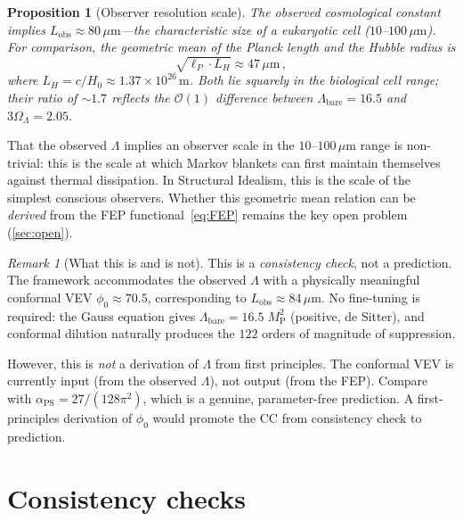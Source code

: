 \documentclass[12pt, a4paper]{article}
\newtheorem{proposition}[theorem]{Proposition}
\theoremstyle{definition}
\theoremstyle{remark}
\newtheorem{remark}[theorem]{Remark}
\newcommand{\MP}{M_{\mathrm{P}}}
\newcommand{\aPS}{\alpha_{\mathrm{PS}}}
\newcommand{\Lobs}{L_{\mathrm{obs}}}
\begin{document}
\begin{proposition}[Observer resolution scale]
\label{prop:Lobs}
The observed cosmological constant implies $\Lobs \approx 80\,\mu\mathrm{m}$---the characteristic size of a eukaryotic cell ($10$--$100\,\mu\mathrm{m}$).
For comparison, the geometric mean of the Planck length and the Hubble radius is
\begin{equation}
\sqrt{\ell_P \cdot L_H} \approx 47\,\mu\mathrm{m}\,,
\end{equation}
where $L_H = c/H_0 \approx 1.37 \times 10^{26}\,\mathrm{m}$.
Both lie squarely in the biological cell range; their ratio of $\sim 1.7$ reflects the $\mathcal{O}(1)$ difference between $\Lambda_{\mathrm{bare}} = 16.5$ and $3\Omega_\Lambda = 2.05$.
\end{proposition}

That the observed $\Lambda$ implies an observer scale in the $10$--$100\,\mu\mathrm{m}$ range is non-trivial: this is the scale at which Markov blankets can first maintain themselves against thermal dissipation.
In Structural Idealism, this is the scale of the simplest conscious observers.
Whether this geometric mean relation can be \emph{derived} from the FEP functional~\eqref{eq:FEP} remains the key open problem (\cref{sec:open}).

\begin{remark}[What this is and is not]
\label{rem:cc_honest}
This is a \emph{consistency check}, not a prediction.
The framework accommodates the observed $\Lambda$ with a physically meaningful conformal VEV $\phi_0 \approx 70.5$, corresponding to $\Lobs \approx 84\,\mu\mathrm{m}$.
No fine-tuning is required: the Gauss equation gives $\Lambda_{\mathrm{bare}} = 16.5\;\MP^2$ (positive, de Sitter), and conformal dilution naturally produces the $122$ orders of magnitude of suppression.

However, this is \emph{not} a derivation of $\Lambda$ from first principles.
The conformal VEV is currently input (from the observed $\Lambda$), not output (from the FEP).
Compare with $\aPS = 27/(128\pi^2)$, which is a genuine, parameter-free prediction.
A first-principles derivation of $\phi_0$ would promote the CC from consistency check to prediction.
\end{remark}


\section{Consistency checks}
\label{sec:checks}
\end{document}

